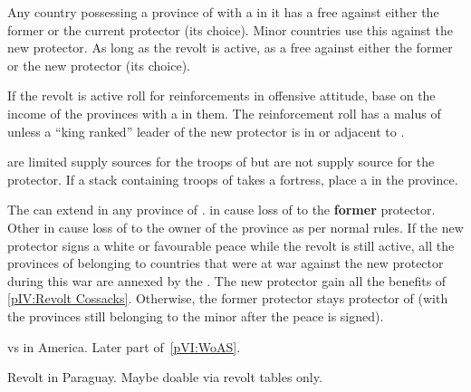 \phdipl
\aparag Any country possessing a province of \regionUkraine with a \REVOLT in
it has a free \CB against either the former or the current protector (its
choice).
\bparag Minor countries use this \CB against the new protector.
\aparag As long as the revolt is active, \TUR as a free \CB against either the
former or the new protector (its choice).

\phadm
\aparag If the revolt is active \paysukraine roll for reinforcements in
offensive attitude, base on the income of the provinces with a \REVOLT in
them.
\bparag The reinforcement roll has a malus of  unless a ``king
ranked'' leader of the new protector is in or adjacent to \paysukraine.

\phmil
\aparag \REVOLT are limited supply sources for the troops of \paysukraine but
are not supply source for the protector.
\aparag If a stack containing troops of \paysukraine takes a fortress, place a
\REVOLT \facemoins in the province.

\phpaix
\aparag The \REVOLT can extend in any province of \regionUkraine.
\bparag \REVOLT in \paysUkraine cause loss of \STAB to the \textbf{former}
protector. Other \REVOLT in \regionUkraine cause loss of \STAB to the owner of
the province as per normal rules.
\aparag If the new protector signs a white or favourable peace while the
revolt is still active, all the provinces of \regionUkraine belonging to
countries that were at war against the new protector during this war are
annexed by the \MIN \paysukraine. The new protector gain all the benefits of
\ref{pIV:Revolt Cossacks}.
\aparag Otherwise, the former protector stays protector of \paysukraine (with
the provinces still belonging to the minor after the peace is signed).


\begin{todo}
  \ANG vs \HIS in America. Later part of~\ref{pVI:WoAS}.
\end{todo}


\begin{todo}
  Revolt in Paraguay. Maybe doable via revolt tables only.
\end{todo}

